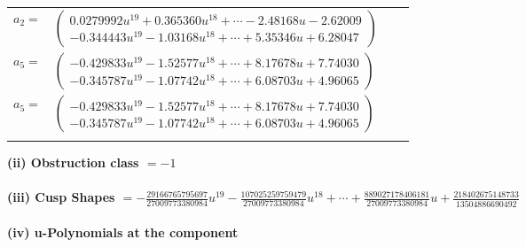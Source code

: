 \documentclass[1p]{elsarticle_modified}
\theoremstyle{definition}
\begin{document}
\begin{tabular}{m{7pt} m{180pt} m{7pt} m{180pt} }
\flushright $a_{2}=$&$\begin{pmatrix}0.0279992 u^{19}+0.365360 u^{18}+\cdots-2.48168 u-2.62009\\-0.344443 u^{19}-1.03168 u^{18}+\cdots+5.35346 u+6.28047\end{pmatrix}$ \\
\flushright $a_{5}=$&$\begin{pmatrix}-0.429833 u^{19}-1.52577 u^{18}+\cdots+8.17678 u+7.74030\\-0.345787 u^{19}-1.07742 u^{18}+\cdots+6.08703 u+4.96065\end{pmatrix}$\\ \flushright $a_{5}=$&$\begin{pmatrix}-0.429833 u^{19}-1.52577 u^{18}+\cdots+8.17678 u+7.74030\\-0.345787 u^{19}-1.07742 u^{18}+\cdots+6.08703 u+4.96065\end{pmatrix}$\\&\end{tabular}
\flushleft \textbf{(ii) Obstruction class $= -1$}\\~\\
\flushleft \textbf{(iii) Cusp Shapes $= -\frac{29166765795697}{27009773380984} u^{19}-\frac{107025259759479}{27009773380984} u^{18}+\cdots+\frac{889027178406181}{27009773380984} u+\frac{218402675148733}{13504886690492}$}\\~\\
\newpage\renewcommand{\arraystretch}{1}
\flushleft \textbf{(iv) u-Polynomials at the component}\newline \\
\end{document}
